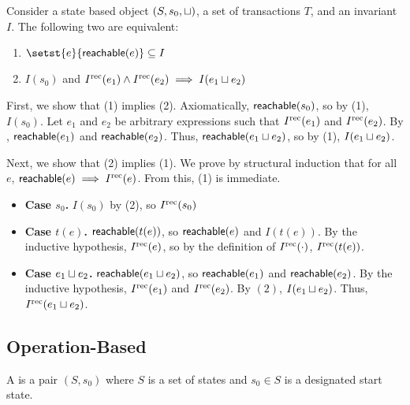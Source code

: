 \begin{claim}
  Consider a state based object $(S, s_0, \sqcup)$, a set of transactions $T$,
  and an invariant $I$. The following two are equivalent:
  \begin{enumerate}[\quad(1)]
    \item
      $\setst{e}{\reachable{e}} \subseteq I$

    \item
      $I(s_0)$ and $I^{\text{rec}}(e_1) \land I^{\text{rec}}(e_2) \implies I(e_1 \sqcup e_2)$
  \end{enumerate}
\end{claim}
\begin{elidableproof}
  First, we show that (1) implies (2). Axiomatically, $\textsf{reachable}(s_0)$, so by
  (1), $I(s_0)$. Let $e_1$ and $e_2$ be arbitrary expressions such that
  $I^{\text{rec}}(e_1)$ and $I^{\text{rec}}(e_2)$. By ,
  $\textsf{reachable}(e_1)$ and $\textsf{reachable}(e_2)$. Thus, $\textsf{reachable}(e_1 \sqcup e_2)$,
  so by (1), $I(e_1 \sqcup e_2)$.

  Next, we show that (2) implies (1). We prove by structural induction that for
  all $e$, $\textsf{reachable}(e) \implies I^{\text{rec}}(e)$. From this, (1) is immediate.
  \begin{itemize}
    \item \textbf{Case $s_0$.}
      $I(s_0)$ by (2), so $I^{\text{rec}}(s_0)$

    \item \textbf{Case $t(e)$.}
      $\textsf{reachable}(t(e))$, so $\textsf{reachable}(e)$ and $I(t(e))$. By the inductive
      hypothesis, $I^{\text{rec}}(e)$, so by the definition of $I^{\text{rec}}(\cdot)$,
      $I^{\text{rec}}(t(e))$.

    \item \textbf{Case $e_1 \sqcup e_2$.}
      $\textsf{reachable}(e_1 \sqcup e_2)$, so $\textsf{reachable}(e_1)$ and $\textsf{reachable}(e_2)$.
      By the inductive hypothesis, $I^{\text{rec}}(e_1)$ and $I^{\text{rec}}(e_2)$. By $(2)$,
      $I(e_1 \sqcup e_2)$. Thus, $I^{\text{rec}}(e_1 \sqcup e_2)$.
  \end{itemize}
\end{elidableproof}

\subsection{Operation-Based}
\begin{definition}
  A  is a pair $(S, s_0)$ where $S$
  is a set of states and $s_0 \in S$ is a designated start state.
\end{definition}

